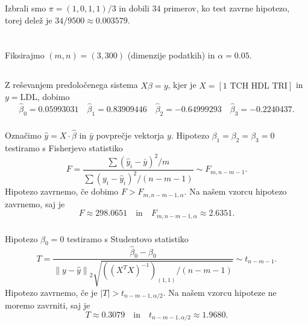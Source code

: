 \documentclass[ letterpaper, titlepage, fleqn]{article}
\newcommand{\norm}[1]{\left\lVert#1\right\rVert}
\begin{document}
\subsubsection{}
Izbrali smo $\pi = (1,0,1,1)/3$ in dobili $34$ primerov, ko test zavrne hipotezo, torej delež je $34/9500 \approx 0.003579$.

\section{}
Fiksirajmo $(m, n) = (3, 300)$ (dimenzije  podatkih) in $\alpha = 0.05$.
\subsection{}
\subsubsection{}
Z reševanjem predoločenega sistema $X\hat{\beta} = y$, kjer je $X = [\text{1 TCH HDL TRI}]$ in $y = \text{LDL}$,  dobimo
$$\hat{\beta}_0 = 0.05993031 \quad \hat{\beta}_1 = 0.83909446 \quad \hat{\beta}_2 = -0.64999293 \quad \hat{\beta}_3 = -0.2240437.$$

\subsubsection{}
Označimo $\hat{y} = X \cdot \hat{\beta}$ in $\bar{y}$ povprečje vektorja $y$. 
Hipotezo $\beta_1 = \beta_2 = \beta_3 = 0$ testiramo s Fisherjevo statistiko
$$F = \frac{\sum (\hat{y}_i - \bar{y})^2 / m}{\sum (y_i - \hat{y}_i)^2 / (n-m-1)} \sim F_{m, n-m-1}.$$
Hipotezo zavrnemo, če dobimo $F > F_{m, n-m-1, \alpha}$. Na našem vzorcu hipotezo zavrnemo, saj je
$$F \approx 298.0651 \quad \text{in} \quad F_{m, n-m-1, \alpha} \approx 2.6351.$$

\subsubsection{}
Hipotezo $\beta_0 = 0$ testiramo s Studentovo statistiko
$$T = \frac{\hat{\beta}_0 - \beta_0}{\norm{y - \hat{y}}_2 \sqrt{\left((X^T X)^{-1}\right)_{(1,1)}/ (n-m-1)}} \sim t_{n-m-1}.$$
Hipotezo zavrnemo, če je $|T| > t_{n-m-1, \alpha/2}$. Na našem vzorcu hipoteze ne moremo zavrniti, saj je
$$T \approx 0.3079 \quad \text{in} \quad t_{n-m-1, \alpha/2} \approx 1.9680.$$

\subsection{}
\end{document}
